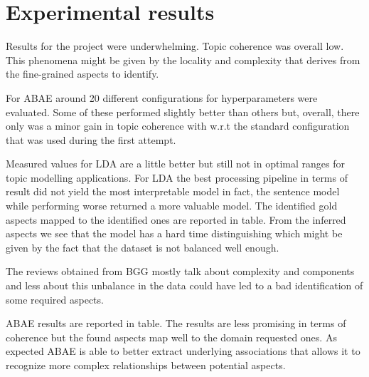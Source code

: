 \section{Experimental results}

Results for the project were underwhelming.
Topic coherence was overall low.
This phenomena might be given by the locality and complexity that derives from the fine-grained aspects to identify.

For ABAE around 20 different configurations for hyperparameters were evaluated.
Some of these performed slightly better than others but, overall, there only was a minor gain in topic coherence with
w.r.t the standard configuration that was used during the first attempt.

Measured values for LDA are a little better but still not in optimal ranges for topic modelling applications.
For LDA the best processing pipeline in terms of result did not yield the most interpretable model in fact,
the sentence model while performing worse returned a more valuable model.
The identified gold aspects mapped to the identified ones are reported in table. %
From the inferred aspects we see that the model has a hard time distinguishing %
which might be given by the fact that the dataset is not balanced well enough.

The reviews obtained from BGG mostly talk about complexity and components and less about %
this unbalance in the data could have led to a bad identification of some required aspects.

ABAE results are reported in table.
The results are less promising in terms of coherence but the found aspects map well to the domain requested
ones.
As expected ABAE is able to better extract underlying associations that allows it to recognize more complex relationships
between potential aspects.
